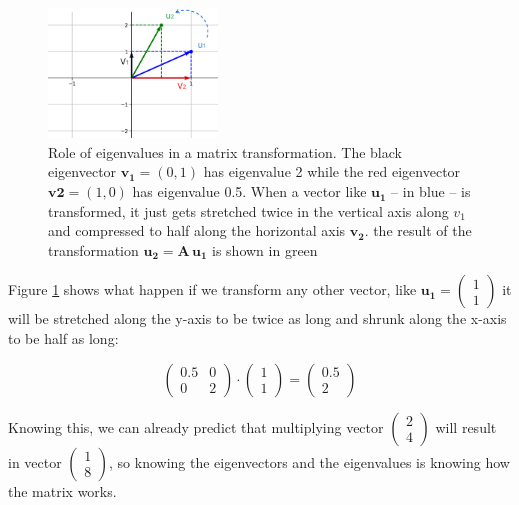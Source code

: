 \documentclass[12pt]{article}
\begin{document}
\begin{figure}
	\begin{center}
		\includegraphics[width=0.4\textwidth]{transform}	
	\end{center}
	\caption{Role of eigenvalues in a matrix transformation. The black eigenvector $\mathbf{v_1} = (0,1)$ has eigenvalue 2 while the red eigenvector $\mathbf{v2}=(1,0)$ has eigenvalue 0.5. When a vector like $\mathbf{u_1}$ -- in blue -- is transformed, it just gets stretched twice in the vertical axis along $v_1$ and compressed to half along the horizontal axis $\mathbf{v_2}$. the result of the transformation $\mathbf{u_2} = \mathbf{A} \, \mathbf{u_1}$ is shown in green}
	\label{fig:transform}
\end{figure}

Figure \ref{fig:transform} shows what happen if we transform any other vector, like $\mathbf{u_1}=\begin{pmatrix}  1\\ 1 \end{pmatrix}$ it will be stretched along the y-axis to be twice as long and shrunk along the x-axis to be half as long:

\begin{equation}
	\begin{pmatrix} 0.5 & 0\\ 0 &  2 \end{pmatrix} \cdot \begin{pmatrix}  1\\ 1 \end{pmatrix} = \begin{pmatrix}  0.5\\ 2 \end{pmatrix}
\end{equation}

Knowing this, we can already predict that multiplying vector $\begin{pmatrix}  2\\ 4 \end{pmatrix}$ will result in vector  $\begin{pmatrix}  1\\ 8 \end{pmatrix}$, so knowing the eigenvectors and the eigenvalues is  knowing how the matrix works.
\end{document}
